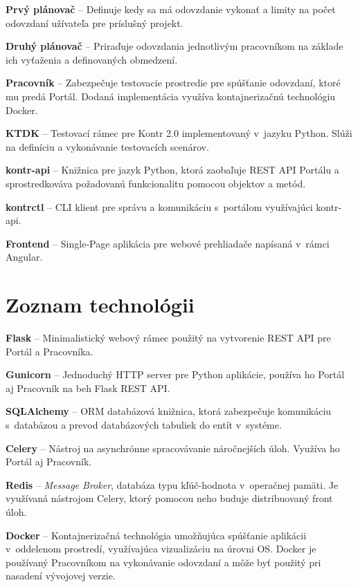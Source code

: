 \documentclass[
  digital, %
  oneside, %
  table,   %
  lof,     %
  lot,   %
]{fithesis3}
\begin{document}
\textbf{Prvý plánovač} -- Definuje kedy sa má odovzdanie vykonať a limity na počet odovzdaní užívateľa pre príslušný projekt.

\textbf{Druhý plánovač} -- Priraďuje odovzdania jednotlivým pracovníkom na základe ich vyťaženia a definovaných obmedzení.

\textbf{Pracovník} -- Zabezpečuje testovacie prostredie pre spúšťanie odovzdaní, ktoré mu predá Portál. Dodaná implementácia využíva kontajnerizačnú technológiu Docker.

\textbf{KTDK} -- Testovací rámec pre Kontr 2.0 implementovaný v~jazyku Python. Slúži na definíciu a vykonávanie testovacích scenárov.

\textbf{kontr-api} -- Knižnica pre jazyk Python, ktorá zaobaľuje REST API Portálu a sprostredkováva požadovanú funkcionalitu pomocou objektov a metód.

\textbf{kontrctl} -- CLI klient pre správu a komunikáciu s~portálom využívajúci kontr-api.

\textbf{Frontend} -- Single-Page aplikácia pre webové prehliadače napísaná v~rámci Angular.



\chapter{Zoznam technológii}

\hspace{\parindent}\textbf{Flask} -- Minimalistický webový rámec použitý na vytvorenie REST API pre Portál a Pracovníka.

\textbf{Gunicorn} -- Jednoduchý HTTP server pre Python aplikácie, používa ho Portál aj Pracovník na beh Flask REST API.

\textbf{SQLAlchemy} -- ORM databázová knižnica, ktorá zabezpečuje komunikáciu s~databázou a prevod databázových tabuliek do entít v~systéme.

\textbf{Celery} -- Nástroj na asynchrónne spracovávanie náročnejších úloh. Využíva ho Portál aj Pracovník.

\textbf{Redis} -- \emph{Message Broker}, databáza typu kľúč-hodnota v~operačnej pamäti. Je využívaná nástrojom Celery, ktorý pomocou neho buduje distribuovaný front úloh.

\textbf{Docker} -- Kontajnerizačná technológia umožňujúca spúšťanie aplikácii v~oddelenom prostredí, využívajúca vizualizáciu na úrovni OS. Docker je používaný Pracovníkom na vykonávanie odovzdaní a môže byť použitý pri nasadení vývojovej verzie.
\end{document}
